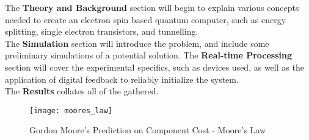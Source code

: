 The \textbf{Theory and Background} section will begin to explain various concepts needed to create an electron spin based quantum computer, such as energy splitting, single electron transistors, and tunnelling. \\
The \textbf{Simulation} section will introduce the problem, and include some preliminary simulations of a potential solution.
The \textbf{Real-time Processing} section will cover the experimental specifics, such as devices used, as well as the application of digital feedback to reliably initialize the system. \\
The \textbf{Results} collates all of the gathered. \\

\begin{figure}[htbp!]
	\centering
	\texttt{[image: moores\_law]}
	\caption[Moore's Law]{Gordon Moore's Prediction on Component Cost - Moore's Law \cite{moore1965cramming}}
	\label{fig::moores_law}
\end{figure}
